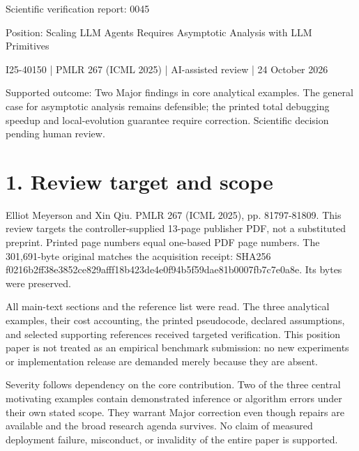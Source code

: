 \documentclass[10pt]{article}
\begin{document}
Scientific verification report: 0045\par
Position: Scaling LLM Agents Requires Asymptotic Analysis with LLM Primitives\par
I25-40150 | PMLR 267 (ICML 2025) | AI-assisted review | 24 October 2026\par
Supported outcome: Two Major findings in core analytical examples. The general case for asymptotic analysis remains defensible; the printed total debugging speedup and local-evolution guarantee require correction. Scientific decision pending human review.\par
\section*{1. Review target and scope}
Elliot Meyerson and Xin Qiu. PMLR 267 (ICML 2025), pp. 81797-81809. This review targets the controller-supplied 13-page publisher PDF, not a substituted preprint. Printed page numbers equal one-based PDF page numbers. The 301,691-byte original matches the acquisition receipt: SHA256 f0216b2ff38e3852ce829afff18b423de4e0f94b5f59dae81b0007fb7c7e0a8e. Its bytes were preserved.\par
All main-text sections and the reference list were read. The three analytical examples, their cost accounting, the printed pseudocode, declared assumptions, and selected supporting references received targeted verification. This position paper is not treated as an empirical benchmark submission: no new experiments or implementation release are demanded merely because they are absent.\par
Severity follows dependency on the core contribution. Two of the three central motivating examples contain demonstrated inference or algorithm errors under their own stated scope. They warrant Major correction even though repairs are available and the broad research agenda survives. No claim of measured deployment failure, misconduct, or invalidity of the entire paper is supported.\par
\end{document}
